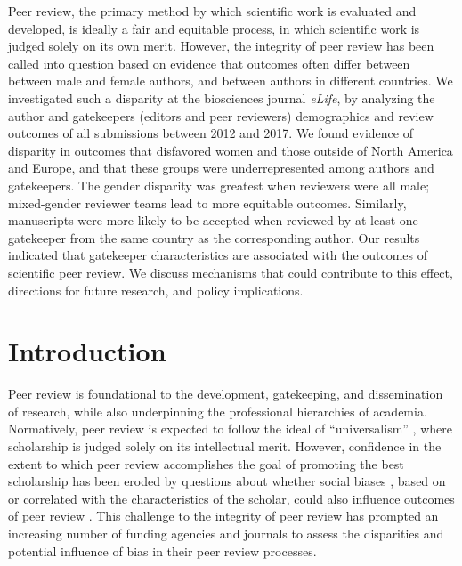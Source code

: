 \documentclass[10pt,letterpaper]{article}
\begin{document}
Peer review, the primary method by which scientific work is evaluated and developed, is ideally a fair and equitable process, in which scientific work is judged solely on its own merit. However, the integrity of peer review has been called into question based on evidence that outcomes often differ between between male and female authors, and between authors in different countries. We investigated such a disparity at the biosciences journal \textit{eLife}, by analyzing the author and gatekeepers (editors and peer reviewers) demographics and review outcomes of all submissions between 2012 and 2017. We found evidence of disparity in outcomes that disfavored women and those outside of North America and Europe, and that these groups were underrepresented among authors and gatekeepers. The gender disparity was greatest when reviewers were all male; mixed-gender reviewer teams lead to more equitable outcomes. Similarly, manuscripts were more likely to be accepted when reviewed by at least one gatekeeper from the same country as the corresponding author.  Our results indicated that gatekeeper characteristics are associated with the outcomes of scientific peer review. We discuss mechanisms that could contribute to this effect, directions for future research, and policy implications.


\linenumbers


\section*{Introduction}
Peer review is foundational to the development, gatekeeping, and dissemination of research, while also underpinning the professional hierarchies of academia. Normatively, peer review is expected to follow the ideal of “universalism” \cite{merton_matthew_1968}, where scholarship is judged solely on its intellectual merit. However, confidence in the extent to which peer review accomplishes the goal of promoting the best scholarship has been eroded by questions about whether social biases \cite{walker_personal_2015}, based on or correlated with the characteristics of the scholar, could also influence outcomes of peer review \cite{lee_bias_2013, pinholster_journals_2016}. This challenge to the integrity of peer review has prompted an increasing number of funding agencies and journals to assess the disparities and potential influence of bias in their peer review processes. 
\end{document}
